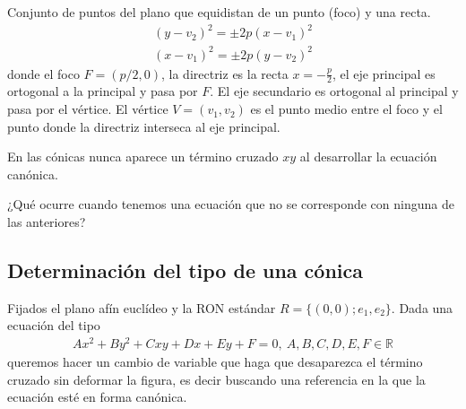 \documentclass[14pt]{book}
\begin{document}
\begin{dfn}[Parábola]
	Conjunto de puntos del plano que equidistan de un punto (foco) y una recta.
	\begin{align*}
		(y - v_2)^2 = \pm 2p(x - v_1)^2 \\
		(x - v_1)^2 = \pm 2p(y - v_2)^2 
	\end{align*}
	donde el foco $F = (p/2, 0)$, la directriz es la recta $x = -\frac{p}{2}$, el eje principal es ortogonal a la principal y pasa por $F$. El eje secundario es ortogonal al principal y pasa por el vértice. El vértice $V = (v_1, v_2)$ es el punto medio entre el foco y el punto donde la directriz interseca al eje principal.
\end{dfn}

\begin{obs}
	En las cónicas nunca aparece un término cruzado $xy$ al desarrollar la ecuación canónica.
\end{obs}

¿Qué ocurre cuando tenemos una ecuación que no se corresponde con ninguna de las anteriores?

\subsection{Determinación del tipo de una cónica}
Fijados el plano afín euclídeo y la RON estándar $R = \{(0,0); e_1, e_2\}$. Dada una ecuación del tipo
\begin{align*}
	Ax^2 + By^2 + Cxy + Dx + Ey + F = 0, \ A, B, C, D, E, F \in \mathbb{R}
\end{align*}
queremos hacer un cambio de variable que haga que desaparezca el término cruzado sin deformar la figura, es decir buscando una referencia en la que la ecuación esté en forma canónica.
\end{document}
